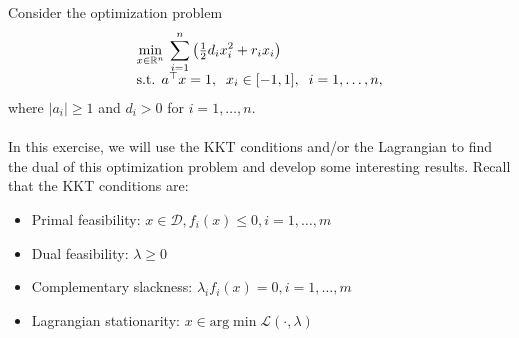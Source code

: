 
Consider the optimization problem
\[
\begin{array}{l}
\min\limits_{x \in \mathbb{R}^{n}} \: \displaystyle\sum_{i=1}^n \left(\tfrac{1}{2}d_i x_i^2 + r_ix_i\right)\\
\mathop{\mathrm{s.t.}} \; a^{\top} x=1, \;\; x_i \in [-1,1], \;\; i=1,\ldots,n,
\end{array}
\]
where $|a_i| \geq 1$ and $d_i > 0$ for $i=1,\ldots,n$. \\ \\ 

In this exercise, we will use the KKT conditions and/or the Lagrangian to find the dual of this optimization problem and develop some interesting results. Recall that the KKT conditions are:

\begin{itemize}
    \item Primal feasibility: $x \in \mathcal{D}, f_i(x) \leq 0, i = 1, \dots, m$
    \item Dual feasibility: $\lambda \geq 0$
    \item Complementary slackness: $\lambda_i f_i(x) = 0, i = 1, \dots, m$
    \item Lagrangian stationarity: $x \in \text{arg} \min \mathcal{L}(\cdot, \lambda)$
\end{itemize}

